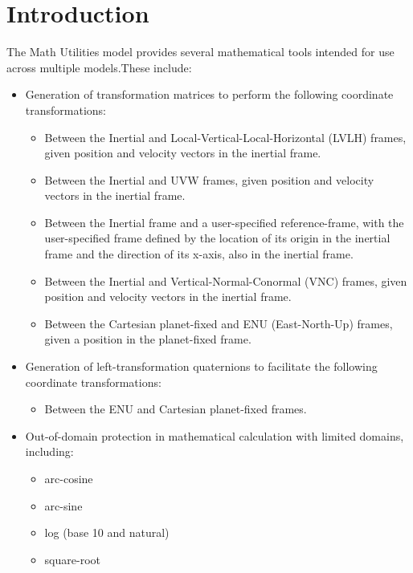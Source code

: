 \documentclass[11pt,fleqn]{report}
\begin{document}
\chapter{Introduction} %
\pagestyle{plain}
The Math Utilities model provides several mathematical tools intended for use
across multiple models.These include:
\begin{itemize}
\item Generation of transformation matrices to perform the following
coordinate transformations:
\begin{itemize}
\item Between the Inertial and Local-Vertical-Local-Horizontal (LVLH)
frames, given position and velocity vectors in the inertial
frame.
\item Between the Inertial and UVW frames, given position and velocity
vectors in the inertial frame.
\item Between the Inertial frame and a user-specified reference-frame,
with the user-specified frame defined by the location of its
origin in the inertial frame and the direction of its x-axis,
also in the inertial frame.
\item Between the Inertial and Vertical-Normal-Conormal (VNC)
frames, given position and velocity vectors in the inertial
frame.
\item Between the Cartesian planet-fixed and ENU (East-North-Up)
frames, given a position in the planet-fixed frame.
\end{itemize}

\item Generation of left-transformation quaternions to facilitate the
following coordinate transformations:
\begin{itemize}
\item Between the ENU and Cartesian planet-fixed frames.
\end{itemize}

\item Out-of-domain protection in mathematical calculation with limited
domains, including:
\begin{itemize}
\item arc-cosine
\item arc-sine
\item log (base 10 and natural)
\item square-root
\end{itemize}


\end{itemize}
\end{document}
